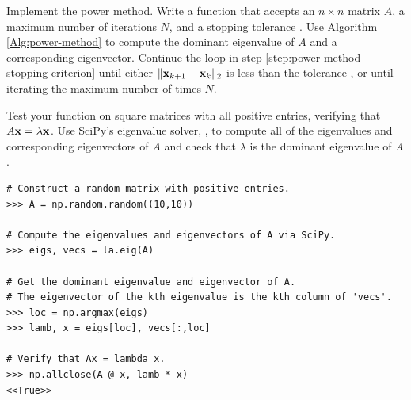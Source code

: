 \begin{problem}{Implement the power method.}
Write a function that accepts an $n \times n$ matrix $A$, a maximum number of iterations $N$, and a stopping tolerance .
Use Algorithm \ref{Alg:power-method} to compute the dominant eigenvalue of $A$ and a corresponding eigenvector.
Continue the loop in step \ref{step:power-method-stopping-criterion} until either $\|\mathbf{x}_{k+1} - \mathbf{x}_k\|_2$ is less than the tolerance , or until iterating the maximum number of times $N$.

Test your function on square matrices with all positive entries, verifying that $A\mathbf{x} = \lambda\mathbf{x}$.
Use SciPy's eigenvalue solver, , to compute all of the eigenvalues and corresponding eigenvectors of $A$ and check that $\lambda$ is the dominant eigenvalue of $A$.

\begin{lstlisting}
# Construct a random matrix with positive entries.
>>> A = np.random.random((10,10))

# Compute the eigenvalues and eigenvectors of A via SciPy.
>>> eigs, vecs = la.eig(A)

# Get the dominant eigenvalue and eigenvector of A.
# The eigenvector of the kth eigenvalue is the kth column of 'vecs'.
>>> loc = np.argmax(eigs)
>>> lamb, x = eigs[loc], vecs[:,loc]

# Verify that Ax = lambda x.
>>> np.allclose(A @ x, lamb * x)
<<True>>
\end{lstlisting}
\end{problem}

